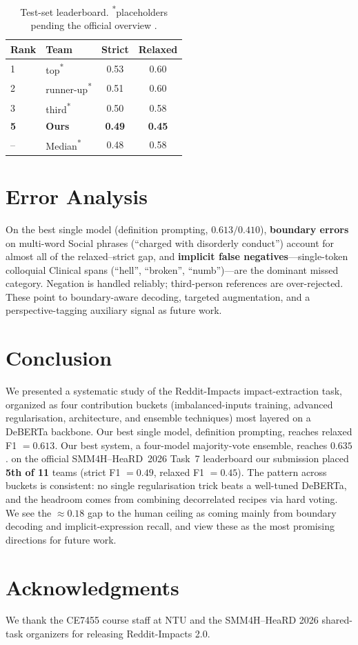\documentclass[11pt]{article}
\begin{document}
\begin{table}[t]
\centering\small
\setlength{\tabcolsep}{5pt}
\begin{tabular}{llcc}
\toprule
Rank & Team & Strict & Relaxed \\
\midrule
1 & top\textsuperscript{*}          & 0.53 & 0.60 \\
2 & runner-up\textsuperscript{*}    & 0.51 & 0.60 \\
3 & third\textsuperscript{*}        & 0.50 & 0.58 \\
\textbf{5} & \textbf{Ours}          & \textbf{0.49} & \textbf{0.45} \\
-- & Median\textsuperscript{*}      & 0.48 & 0.58 \\
\bottomrule
\end{tabular}
\caption{Test-set leaderboard. \textsuperscript{*}placeholders pending
the official overview \citep{smm4h-heard-overview-2026}.}
\label{tab:leaderboard}
\end{table}

\section{Error Analysis}
\label{sec:error}

On the best single model (definition prompting, $0.613/0.410$),
\textbf{boundary errors} on multi-word Social phrases (``charged with
disorderly conduct'') account for almost all of the relaxed--strict
gap, and \textbf{implicit false negatives}---single-token colloquial
Clinical spans (``hell'', ``broken'', ``numb'')---are the dominant
missed category. Negation is handled reliably; third-person references
are over-rejected. These point to boundary-aware decoding, targeted
augmentation, and a perspective-tagging auxiliary signal as future work.

\section{Conclusion}
\label{sec:conclusion}

We presented a systematic study of the Reddit-Impacts impact-extraction
task, organized as four contribution buckets (imbalanced-inputs
training, advanced regularisation, architecture, and ensemble
techniques) most layered on a DeBERTa backbone. Our best single model, definition
prompting, reaches relaxed F1 $= 0.613$. Our best system, a four-model
majority-vote ensemble, reaches $0.635$. on the official SMM4H--HeaRD~2026
Task~7 leaderboard our submission placed \textbf{5th of 11} teams
(strict F1 $=0.49$, relaxed F1 $=0.45$). The pattern across buckets is consistent:
no single regularisation trick beats a well-tuned DeBERTa, and the
headroom comes from combining decorrelated recipes via hard voting.
We see the $\approx 0.18$ gap to the human ceiling as coming mainly
from boundary decoding and implicit-expression recall, and view these
as the most promising directions for future work.

\section*{Acknowledgments}

We thank the CE7455 course staff at NTU and the SMM4H--HeaRD 2026
shared-task organizers for releasing Reddit-Impacts 2.0.


\end{document}
